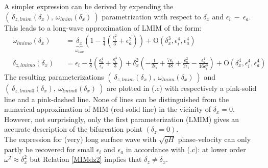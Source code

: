 \documentclass[a4paper,11pt]{article}
\begin{document}
A simpler expression can be derived by expending the $(\ \delta_{z,lmim}(\delta_x),\ \omega_{lmim}(\delta_x)\ )$ parametrization with respect to $\delta_x$ and $\epsilon_i\ -\ \epsilon_a$. This leads to a long-wave approximation of LMIM of the form:
\begin{subequations}
	\begin{alignat}{2}
	\label{MIMomega}
	&\omega_{lmimo}(\delta_x) &&=\underbrace{\delta_x}_{\omega_{lsw}}\left(1-\frac{1}{4}\left(\frac{\epsilon_i^2}{3}+\epsilon_a^2\right)\right)
	 + \mathrm{O}(\delta_x^3,\epsilon_i^4,\epsilon_a^4)\\[3mm]
	\label{MIMdz}
	&\delta_{z,lmimo}(\delta_x) &&=\epsilon_i
	-\frac{1}{8}\left(\frac{\epsilon_a^4}{\epsilon_i}+\frac{\epsilon_i^3}{3}\right)
    +\delta_x^2\left(
    -\frac{1}{2\epsilon_i}+\frac{7\epsilon_i}{48}
    +\frac{\epsilon_a^2}{2\epsilon_i}-\frac{\epsilon_a^4}{16\epsilon_i^3}
    \right)
	 + \mathrm{O}(\delta_x^4,\epsilon_i^4,\epsilon_a^4)
   	\end{alignat}
\end{subequations}
The resulting parameterizations $(\ \delta_{z,lmim}(\delta_x),\ \omega_{lmim}(\delta_x)\ )$ and $(\ \delta_{z,lmim0}(\delta_x),\ \omega_{lmim0}(\delta_x)\ )$ are plotted in (.c) with respectively a pink-solid line and a pink-dashed line. None of lines can be distinguished from the numerical approximation of MIM (red-solid line) in the vicinity of $\delta_x=0$. However, not surprisingly, only the first parameterization (LMIM) gives an accurate description of the bifurcation point $(\delta_z=0)$.\\
The expression for (very) long surface wave with $\sqrt{gH}$ phase-velocity can only partly be recovered for small $\epsilon_i$ and $\epsilon_a$ in accordance with (.c): at lower order $\omega^2\approx\delta_x^2$ but Relation \ref{MIMdz2} implies that $\delta_z\neq\delta_x$.\\
\end{document}
